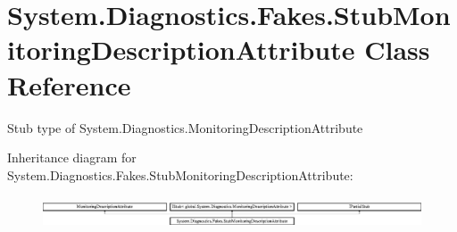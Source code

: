 \hypertarget{class_system_1_1_diagnostics_1_1_fakes_1_1_stub_monitoring_description_attribute}{\section{System.\-Diagnostics.\-Fakes.\-Stub\-Monitoring\-Description\-Attribute Class Reference}
\label{class_system_1_1_diagnostics_1_1_fakes_1_1_stub_monitoring_description_attribute}
}


Stub type of System.\-Diagnostics.\-Monitoring\-Description\-Attribute 


Inheritance diagram for System.\-Diagnostics.\-Fakes.\-Stub\-Monitoring\-Description\-Attribute\-:\begin{figure}[H]
\begin{center}
\leavevmode
\includegraphics[height=0.947547cm]{class_system_1_1_diagnostics_1_1_fakes_1_1_stub_monitoring_description_attribute}
\end{center}
\end{figure}
